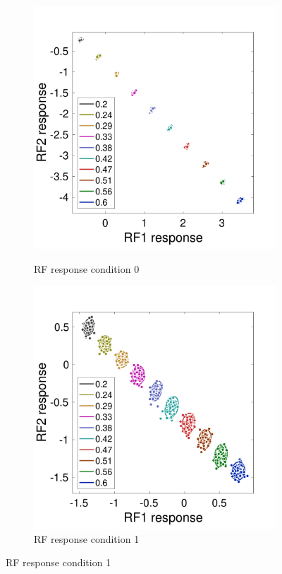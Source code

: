 \documentclass{jov}
\begin{document}
\begin{figure}
\centering
        \begin{subfigure}[b]{0.3 \textwidth}
        \caption{RF response condition 0}
        \includegraphics[width=\textwidth]{../Figures/Figure9/Figure9_c.pdf}
        \label{fig:case0RFResponse}
    \end{subfigure}
        \begin{subfigure}[b]{0.3 \textwidth}
        \caption{RF response condition 1}
        \includegraphics[width=\textwidth]{../Figures/Figure9/Figure9_a.pdf}

\end{subfigure}
\end{figure}
\end{document}

